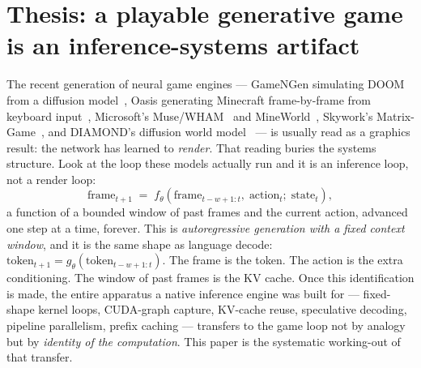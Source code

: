 \documentclass[11pt]{article}
\begin{document}
\begin{abstract}
farm --- with single-player as the latency-bound stream and spectate/multiplayer as batched rollouts in the
throughput regime. Fourth, \textbf{authoring}: node-graph editing against a \emph{persistent} world-model
session is prefix-cache reuse --- editing the game while it runs swaps the conditioning suffix against a
cached world-state prefix. We close with game-specific \textbf{open problems} that we do not duplicate from
the series' open-problems companion but cross-reference and extend --- centrally, that client-side prediction
and speculative decoding are \emph{the same algorithm}: a cheap local draft rolled forward optimistically and
reconciled against an authoritative target, with rollback on disagreement. Because the frame is the token,
that isomorphism is exact, and the open question it raises --- the acceptance criterion for a \emph{perceptual}
rather than a distributional match --- is, to our knowledge, new. Frame numbers for a world model on our stack
are labelled projection; the primitives they rest on are labelled measured.
\end{abstract}

\section{Thesis: a playable generative game is an inference-systems artifact}
\label{sec:thesis}

The recent generation of neural game engines --- GameNGen simulating DOOM from a diffusion
model~\cite{gamengen}, Oasis generating Minecraft frame-by-frame from keyboard input~\cite{oasis}, Microsoft's
Muse/WHAM~\cite{wham} and MineWorld~\cite{mineworld}, Skywork's Matrix-Game~\cite{matrixgame}, and
DIAMOND's diffusion world model~\cite{diamond} --- is usually read as a graphics result: the network has
learned to \emph{render}. That reading buries the systems structure. Look at the loop these models actually
run and it is an inference loop, not a render loop:
\begin{equation}
\text{frame}_{t+1} \;=\; f_\theta\!\left(\text{frame}_{t-w+1{:}t},\; \text{action}_t;\; \text{state}_t\right),
\label{eq:loop}
\end{equation}
a function of a bounded window of past frames and the current action, advanced one step at a time, forever.
This is \emph{autoregressive generation with a fixed context window}, and it is the same shape as language
decode: \(\text{token}_{t+1}=g_\theta(\text{token}_{t-w+1{:}t})\). The frame is the token. The action is the
extra conditioning. The window of past frames is the KV cache. Once this identification is made, the entire
apparatus a native inference engine was built for --- fixed-shape kernel loops, CUDA-graph capture, KV-cache
reuse, speculative decoding, pipeline parallelism, prefix caching --- transfers to the game loop not by
analogy but by \emph{identity of the computation}. This paper is the systematic working-out of that transfer.
\end{document}
